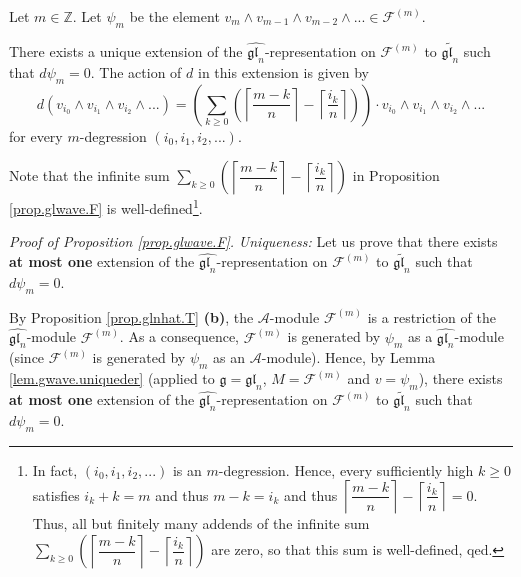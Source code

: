 \documentclass[etingof-lie.tex]{subfiles}
\begin{document}
\begin{proposition}
\label{prop.glwave.F}Let $m\in\mathbb{Z}$. Let $\psi_{m}$ be the element
$v_{m}\wedge v_{m-1}\wedge v_{m-2}\wedge...\in\mathcal{F}^{\left(  m\right)
}$.

There exists a unique extension of the $\widehat{\mathfrak{gl}_{n}}%
$-representation on $\mathcal{F}^{\left(  m\right)  }$ to
$\widetilde{\mathfrak{gl}_{n}}$ such that $d\psi_{m}=0$. The action of $d$ in
this extension is given by%
\[
d\left(  v_{i_{0}}\wedge v_{i_{1}}\wedge v_{i_{2}}\wedge...\right)  =\left(
\sum\limits_{k\geq0}\left(  \left\lceil \dfrac{m-k}{n}\right\rceil
-\left\lceil \dfrac{i_{k}}{n}\right\rceil \right)  \right)  \cdot v_{i_{0}%
}\wedge v_{i_{1}}\wedge v_{i_{2}}\wedge...
\]
for every $m$-degression $\left(  i_{0},i_{1},i_{2},...\right)  $.
\end{proposition}

Note that the infinite sum $\sum\limits_{k\geq0}\left(  \left\lceil
\dfrac{m-k}{n}\right\rceil -\left\lceil \dfrac{i_{k}}{n}\right\rceil \right)
$ in Proposition \ref{prop.glwave.F} is well-defined\footnote{In fact,
$\left(  i_{0},i_{1},i_{2},...\right)  $ is an $m$-degression. Hence, every
sufficiently high $k\geq0$ satisfies $i_{k}+k=m$ and thus $m-k=i_{k}$ and thus
$\left\lceil \dfrac{m-k}{n}\right\rceil -\left\lceil \dfrac{i_{k}}%
{n}\right\rceil =0$. Thus, all but finitely many addends of the infinite sum
$\sum\limits_{k\geq0}\left(  \left\lceil \dfrac{m-k}{n}\right\rceil
-\left\lceil \dfrac{i_{k}}{n}\right\rceil \right)  $ are zero, so that this
sum is well-defined, qed.}.

\textit{Proof of Proposition \ref{prop.glwave.F}.} \textit{Uniqueness:} Let us
prove that there exists \textbf{at most one} extension of the
$\widehat{\mathfrak{gl}_{n}}$-representation on $\mathcal{F}^{\left(
m\right)  }$ to $\widetilde{\mathfrak{gl}_{n}}$ such that $d\psi_{m}=0$.

By Proposition \ref{prop.glnhat.T} \textbf{(b)}, the $\mathcal{A}$-module
$\mathcal{F}^{\left(  m\right)  }$ is a restriction of the
$\widehat{\mathfrak{gl}_{n}}$-module $\mathcal{F}^{\left(  m\right)  }$. As a
consequence, $\mathcal{F}^{\left(  m\right)  }$ is generated by $\psi_{m}$ as
a $\widehat{\mathfrak{gl}_{n}}$-module (since $\mathcal{F}^{\left(  m\right)
}$ is generated by $\psi_{m}$ as an $\mathcal{A}$-module). Hence, by Lemma
\ref{lem.gwave.uniqueder} (applied to $\mathfrak{g}=\mathfrak{gl}_{n}$,
$M=\mathcal{F}^{\left(  m\right)  }$ and $v=\psi_{m}$), there exists
\textbf{at most one} extension of the $\widehat{\mathfrak{gl}_{n}}%
$-representation on $\mathcal{F}^{\left(  m\right)  }$ to
$\widetilde{\mathfrak{gl}_{n}}$ such that $d\psi_{m}=0$.
\end{document}
